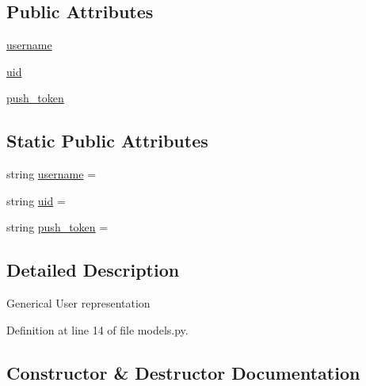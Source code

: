 \subsection*{Public Attributes}
\begin{DoxyCompactItemize}
\item 
\hyperlink{classserver_1_1src_1_1models_1_1_user_a8ff12934f8cd0b6ff62cc6fd926f8e65}{username}
\item 
\hyperlink{classserver_1_1src_1_1models_1_1_user_a3c77fa137fbf4878442d55a49909fa1b}{uid}
\item 
\hyperlink{classserver_1_1src_1_1models_1_1_user_a14d1ac6e4c3bde5bb16d1393b881e907}{push\+\_\+token}
\end{DoxyCompactItemize}
\subsection*{Static Public Attributes}
\begin{DoxyCompactItemize}
\item 
string \hyperlink{classserver_1_1src_1_1models_1_1_user_acb75051a64b473f00340abd8d8cd379a}{username} = \textquotesingle{}\textquotesingle{}
\item 
string \hyperlink{classserver_1_1src_1_1models_1_1_user_a9a4d7dce0947f4e81278a993244fb3e7}{uid} = \textquotesingle{}\textquotesingle{}
\item 
string \hyperlink{classserver_1_1src_1_1models_1_1_user_ab6574a566e1351de30f59603fcb5f087}{push\+\_\+token} = \textquotesingle{}\textquotesingle{}
\end{DoxyCompactItemize}


\subsection{Detailed Description}
\begin{DoxyVerb}Generical User representation \end{DoxyVerb}
 

Definition at line 14 of file models.\+py.



\subsection{Constructor \& Destructor Documentation}
